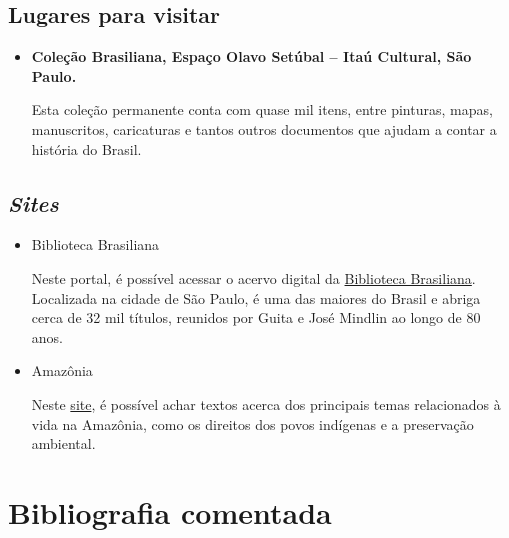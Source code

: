 \documentclass[12pt]{extarticle}
\begin{document}
\subsection{Lugares para visitar}

\begin{itemize}
\item\textbf{Coleção Brasiliana, Espaço Olavo Setúbal -- Itaú Cultural, São Paulo.}

Esta coleção permanente conta com quase mil itens, entre pinturas,
mapas, manuscritos, caricaturas e tantos outros documentos que ajudam a
contar a história do Brasil.
\end{itemize}

\subsection{\emph{Sites}}

\begin{itemize}
\item Biblioteca Brasiliana

Neste portal, é possível acessar o acervo digital da \href{http://www.bbm.usp.br/}{Biblioteca
Brasiliana}. Localizada na cidade de São Paulo, é uma das maiores do
Brasil e abriga cerca de 32 mil títulos, reunidos por Guita e José
Mindlin ao longo de 80 anos.

 \item Amazônia

 Neste \href{https://amazonia.org.br}{site}, é possível achar textos acerca dos principais temas 
 relacionados à vida na Amazônia, como os direitos dos povos indígenas e
 a preservação ambiental.
\end{itemize}

\section{Bibliografia comentada}
\end{document}
